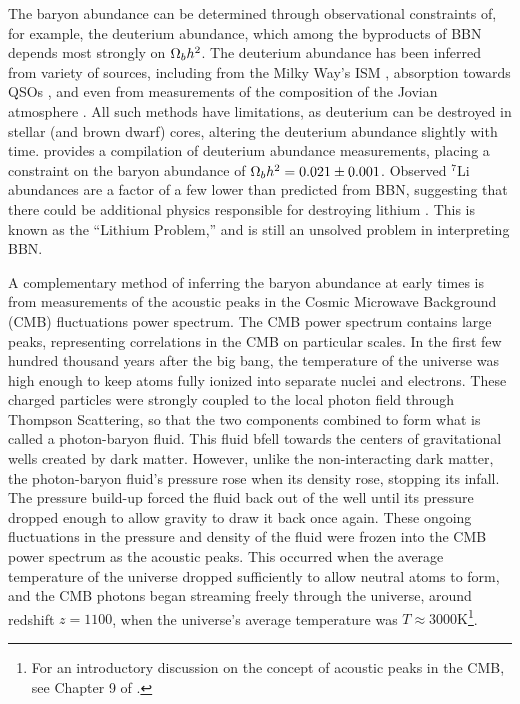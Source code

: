 

The baryon abundance can be determined through observational
constraints of, for example, the deuterium abundance, which among the
byproducts of BBN depends most strongly on $\Omega_b h^2$. The
deuterium abundance has been inferred from variety of sources,
including from the Milky Way's ISM \citep{Linsky1993, Linsky1995},
absorption towards QSOs \citep{Tytler1996, Kirkman2003}, and even from
measurements of the composition of the Jovian atmosphere
\citep{Niemann1996}. All such methods have limitations, as deuterium
can be destroyed in stellar (and brown dwarf) cores, altering the
deuterium abundance slightly with time. \citet{Iocco2009} provides a
compilation of deuterium abundance measurements, placing a
constraint on the baryon abundance of $\Omega_b h^2 = 0.021 \pm
0.001$. Observed $^7$Li abundances are a factor of a few lower than
predicted from BBN, suggesting that there could be additional physics
responsible for destroying lithium \citep{Suzuki2000,
  Melendez2004}. This is known as the ``Lithium Problem,'' and is
still an unsolved problem in interpreting BBN.

A complementary method of inferring the baryon abundance at early
times is from measurements of the acoustic peaks in the Cosmic
Microwave Background (CMB) fluctuations power spectrum. The CMB power
spectrum contains large peaks, representing correlations in the CMB on
particular scales. In the first few hundred thousand years after the
big bang, the temperature of the universe was high enough to keep
atoms fully ionized into separate nuclei and electrons. These charged
particles were strongly coupled to the local photon field through
Thompson Scattering, so that the two components combined to form what
is called a photon-baryon fluid. This fluid bfell towards the centers
of gravitational wells created by dark matter. However, unlike the
non-interacting dark matter, the photon-baryon fluid's pressure rose
when its density rose, stopping its infall. The pressure build-up
forced the fluid back out of the well until its pressure dropped
enough to allow gravity to draw it back once again. These ongoing
fluctuations in the pressure and density of the fluid were frozen into
the CMB power spectrum as the acoustic peaks. This occurred when the
average temperature of the universe dropped sufficiently to allow
neutral atoms to form, and the CMB photons began streaming freely
through the universe, around redshift $z=1100$, when the universe's
average temperature was $T\approx 3000\textrm{K}$\footnote{For an
  introductory discussion on the concept of acoustic peaks in the CMB,
  see Chapter 9 of \citet{Ryden2003}.}.


